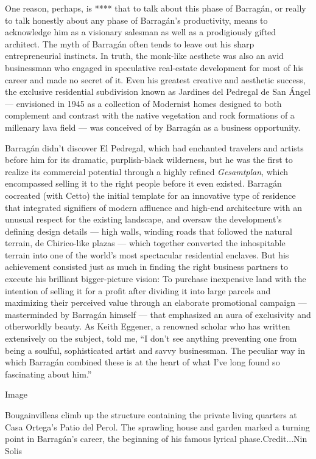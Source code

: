 One reason, perhaps, is **** that to talk about this phase of Barragán,
or really to talk honestly about any phase of Barragán's productivity,
means to acknowledge him as a visionary salesman as well as a
prodigiously gifted architect. The myth of Barragán often tends to leave
out his sharp entrepreneurial instincts. In truth, the monk-like
aesthete was also an avid businessman who engaged in speculative
real-estate development for most of his career and made no secret of it.
Even his greatest creative and aesthetic success, the exclusive
residential subdivision known as Jardines del Pedregal de San Ángel ---
envisioned in 1945 as a collection of Modernist homes designed to both
complement and contrast with the native vegetation and rock formations
of a millenary lava field --- was conceived of by Barragán as a business
opportunity.

Barragán didn't discover El Pedregal, which had enchanted travelers and
artists before him for its dramatic, purplish-black wilderness, but he
was the first to realize its commercial potential through a highly
refined \emph{Gesamtplan}, which encompassed selling it to the right
people before it even existed. Barragán cocreated (with Cetto) the
initial template for an innovative type of residence that integrated
signifiers of modern affluence and high-end architecture with an unusual
respect for the existing landscape, and oversaw the development's
defining design details --- high walls, winding roads that followed the
natural terrain, de Chirico-like plazas --- which together converted the
inhospitable terrain into one of the world's most spectacular
residential enclaves. But his achievement consisted just as much in
finding the right business partners to execute his brilliant
bigger-picture vision: To purchase inexpensive land with the intention
of selling it for a profit after dividing it into large parcels and
maximizing their perceived value through an elaborate promotional
campaign --- masterminded by Barragán himself --- that emphasized an
aura of exclusivity and otherworldly beauty. As Keith Eggener, a
renowned scholar who has written extensively on the subject, told me,
``I don't see anything preventing one from being a soulful,
sophisticated artist and savvy businessman. The peculiar way in which
Barragán combined these is at the heart of what I've long found so
fascinating about him.''

Image

Bougainvilleas climb up the structure containing the private living
quarters at Casa Ortega's Patio del Perol. The sprawling house and
garden marked a turning point in Barragán's career, the beginning of his
famous lyrical phase.Credit...Nin Solis

